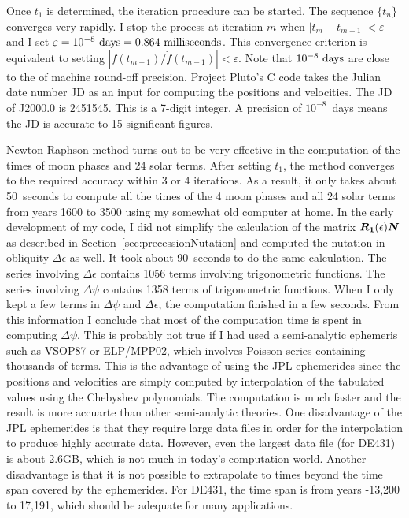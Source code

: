 \documentclass[12pt]{article}
\newcommand{\ve}[1]{\mbox{\boldmath $#1$}}
\begin{document}
\begin{CJK}{UTF8}{bkai}
Once $t_1$ is determined, the iteration procedure can be started. The sequence $\{t_n\}$ 
converges very rapidly. I stop the process at iteration $m$ when $|t_m-t_{m-1}|<\varepsilon$
and I set $\varepsilon=10^{-8}~{\rm days}=0.864~{\rm milliseconds}$. This convergence 
criterion is equivalent to setting $|f(t_{m-1})/\dot{f}(t_{m-1})| < \varepsilon$. 
Note that $10^{-8}~{\rm days}$ are close to the of machine round-off precision. 
Project Pluto's C code takes the Julian date number JD as an input for computing 
the positions and velocities. The JD of J2000.0 is 2451545. This is a 7-digit integer. 
A precision of $10^{-8}$~days means the JD is accurate to 15 significant figures.

Newton-Raphson method turns out to be very effective in the computation of the times 
of moon phases and 24 solar terms. After setting $t_1$, the method converges to 
the required accuracy within 3 or 4 iterations. As a result, it only takes about 50~seconds 
to compute all the times of the 4 moon phases and all 24 solar terms from years 1600 
to 3500 using my somewhat old computer at home. In the early development of my 
code, I did not simplify the calculation of the matrix $\ve{R_1}(\epsilon)\ve{N}$ 
as described in Section~\ref{sec:precessionNutation} and computed 
the nutation in obliquity $\Delta \epsilon$ 
as well. It took about 90~seconds to do the same calculation. The series involving 
$\Delta \epsilon$ contains 1056 terms involving trigonometric functions. The series 
involving $\Delta \psi$ contains 1358 terms of trigonometric functions. When I 
only kept a few terms in $\Delta \psi$ and $\Delta \epsilon$, the computation 
finished in a few seconds. From this 
information I conclude that most of the computation time is spent in 
computing $\Delta \psi$. This is probably not true if I had used a semi-analytic 
ephemeris such as \href{http://neoprogrammics.com/vsop87/}{VSOP87} or 
\href{http://adsabs.harvard.edu/abs/2003A%26A...404..735C}{ELP/MPP02}, which involves 
Poisson series containing thousands of terms. This is the advantage of using 
the JPL ephemerides since the positions and velocities are simply computed 
by interpolation of the tabulated values using the Chebyshev polynomials. 
The computation is much faster and the result is more accuarte than other 
semi-analytic theories. One disadvantage of the JPL ephemerides is that they 
require large data files in order for the interpolation to produce highly 
accurate data. However, even the largest data file (for DE431) is about 2.6GB, which 
is not much in today's computation world. Another disadvantage is that it is not 
possible to extrapolate to times beyond the time span covered by the ephemerides. 
For DE431, the time span is from years -13,200 to 17,191, which should be adequate 
for many applications.


\end{CJK}
\end{document}
